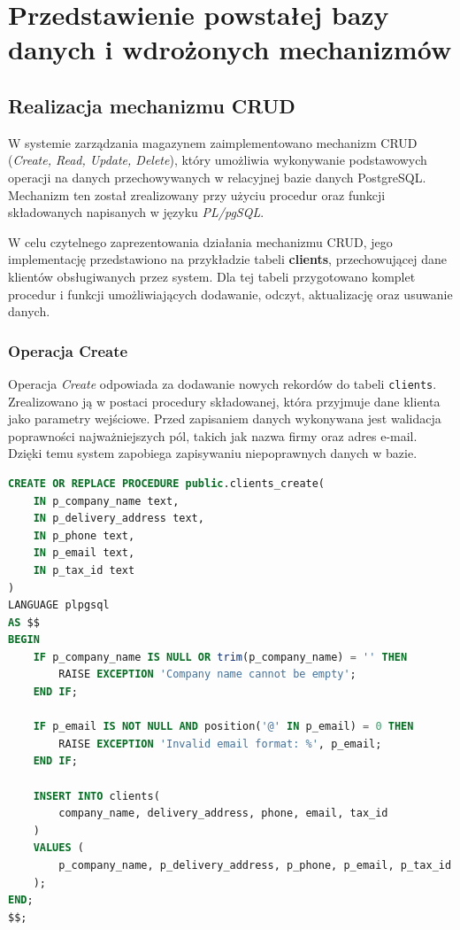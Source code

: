 \chapter{Przedstawienie powstałej bazy danych i wdrożonych mechanizmów}

\section{Realizacja mechanizmu CRUD}

W systemie zarządzania magazynem zaimplementowano mechanizm CRUD
(\textit{Create, Read, Update, Delete}), który umożliwia wykonywanie
podstawowych operacji na danych przechowywanych w relacyjnej bazie danych
PostgreSQL. Mechanizm ten został zrealizowany przy użyciu procedur oraz
funkcji składowanych napisanych w języku \textit{PL/pgSQL}.

W celu czytelnego zaprezentowania działania mechanizmu CRUD,
jego implementację przedstawiono na przykładzie tabeli
\textbf{clients}, przechowującej dane klientów obsługiwanych przez system.
Dla tej tabeli przygotowano komplet procedur i funkcji umożliwiających
dodawanie, odczyt, aktualizację oraz usuwanie danych.

\subsection{Operacja Create}

Operacja \textit{Create} odpowiada za dodawanie nowych rekordów do tabeli
\texttt{clients}. Zrealizowano ją w postaci procedury składowanej,
która przyjmuje dane klienta jako parametry wejściowe.
Przed zapisaniem danych wykonywana jest walidacja poprawności
najważniejszych pól, takich jak nazwa firmy oraz adres e-mail.
Dzięki temu system zapobiega zapisywaniu niepoprawnych danych w bazie.

\begin{lstlisting}[language=SQL, caption={Procedura dodawania klienta}]
CREATE OR REPLACE PROCEDURE public.clients_create(
    IN p_company_name text,
    IN p_delivery_address text,
    IN p_phone text,
    IN p_email text,
    IN p_tax_id text
)
LANGUAGE plpgsql
AS $$
BEGIN
    IF p_company_name IS NULL OR trim(p_company_name) = '' THEN
        RAISE EXCEPTION 'Company name cannot be empty';
    END IF;

    IF p_email IS NOT NULL AND position('@' IN p_email) = 0 THEN
        RAISE EXCEPTION 'Invalid email format: %', p_email;
    END IF;

    INSERT INTO clients(
        company_name, delivery_address, phone, email, tax_id
    )
    VALUES (
        p_company_name, p_delivery_address, p_phone, p_email, p_tax_id
    );
END;
$$;
\end{lstlisting}


